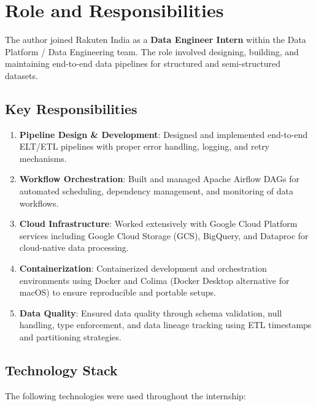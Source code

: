 \documentclass[12pt, a4paper]{article}
\begin{document}
\section{Role and Responsibilities}
\label{sec:role}

\noindent The author joined Rakuten India as a \textbf{Data Engineer Intern} within the Data Platform / Data Engineering team. The role involved designing, building, and maintaining end-to-end data pipelines for structured and semi-structured datasets.

\subsection{Key Responsibilities}

\begin{enumerate}[leftmargin=1.5cm]
    \item \textbf{Pipeline Design \& Development}: Designed and implemented end-to-end ELT/ETL pipelines with proper error handling, logging, and retry mechanisms.
    \item \textbf{Workflow Orchestration}: Built and managed Apache Airflow DAGs for automated scheduling, dependency management, and monitoring of data workflows.
    \item \textbf{Cloud Infrastructure}: Worked extensively with Google Cloud Platform services including Google Cloud Storage (GCS), BigQuery, and Dataproc for cloud-native data processing.
    \item \textbf{Containerization}: Containerized development and orchestration environments using Docker and Colima (Docker Desktop alternative for macOS) to ensure reproducible and portable setups.
    \item \textbf{Data Quality}: Ensured data quality through schema validation, null handling, type enforcement, and data lineage tracking using ETL timestamps and partitioning strategies.
\end{enumerate}

\subsection{Technology Stack}

\noindent The following technologies were used throughout the internship:
\end{document}
